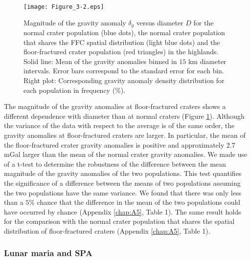 \begin{figure}[h!]
  \graphicspath{ {/Users/thorey/Documents/These/Projet/FFC/Gravi_GRAIL/Article/Papier/SOUMISSION_2_EPSL/} }
  \begin{center}

    \texttt{[image: Figure\_3-2.eps]}
    \caption{Magnitude  of  the   gravity  anomaly  $\delta_g$  versus
      diameter $D$ for  the normal crater population  (blue dots), the
      normal   crater  population   that   shares   the  FFC   spatial
      distribution (light  blue dots)  and the  floor-fractured crater
      population (red triangles) in the highlands. Solid line: Mean of
      the  gravity anomalies  binned  in $15$  km diameter  intervals.
      Error bars correspond to the standard error for each bin.  Right
      plot:  Corresponding gravity  anomaly  density distribution  for
      each population in frequency ($\%$).}
    \label{Figure3-2}
  \end{center}
\end{figure}

The  magnitude of  the  gravity anomalies  at floor-fractured  craters
shows  a different  dependence with  diameter than  at normal  craters
(Figure  \ref{Figure3-2}).  Although  the  variance of  the data  with
respect to the average is of  the same order, the gravity anomalies at
floor-fractured craters  are larger.  In  particular, the mean  of the
floor-fractured crater gravity anomalies is positive and approximately
$2.7$  mGal  larger  than  the  mean  of  the  normal  crater  gravity
anomalies.  We made use of a t-test to determine the robustness of the
difference between the mean magnitude  of the gravity anomalies of the
two  populations.    This  test  quantifies  the   significance  of  a
difference  between the  means  of two  populations  assuming the  two
populations have the same variance.  We found that there was only less
than  a $5\%$  chance  that the  difference  in the  mean  of the  two
populations  could have  occurred by  chance (Appendix  \ref{chap:A5},
Table 1).   The same result holds  for the comparison with  the normal
crater   population   that   shares  the   spatial   distribution   of
floor-fractured craters (Appendix \ref{chap:A5}, Table 1).

\subsubsection{Lunar maria and SPA}
\label{sec:lunar-maria-spa}
  
